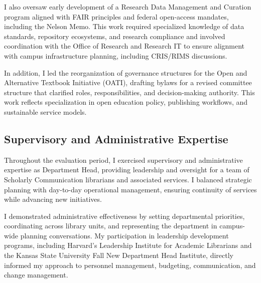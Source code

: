 I also oversaw early development of a Research Data Management and Curation program aligned with FAIR principles and federal open-access mandates, including the Nelson Memo. This work required specialized knowledge of data standards, repository ecosystems, and research compliance and involved coordination with the Office of Research and Research IT to ensure alignment with campus infrastructure planning, including CRIS/RIMS discussions.

In addition, I led the reorganization of governance structures for the Open and Alternative Textbook Initiative (OATI), drafting bylaws for a revised committee structure that clarified roles, responsibilities, and decision-making authority. This work reflects specialization in open education policy, publishing workflows, and sustainable service models.

\subsection*{Supervisory and Administrative Expertise}

Throughout the evaluation period, I exercised supervisory and administrative expertise as Department Head, providing leadership and oversight for a team of Scholarly Communication librarians and associated services. I balanced strategic planning with day-to-day operational management, ensuring continuity of services while advancing new initiatives.

I demonstrated administrative effectiveness by setting departmental priorities, coordinating across library units, and representing the department in campus-wide planning conversations. My participation in leadership development programs, including Harvard’s Leadership Institute for Academic Librarians and the Kansas State University Fall New Department Head Institute, directly informed my approach to personnel management, budgeting, communication, and change management.


